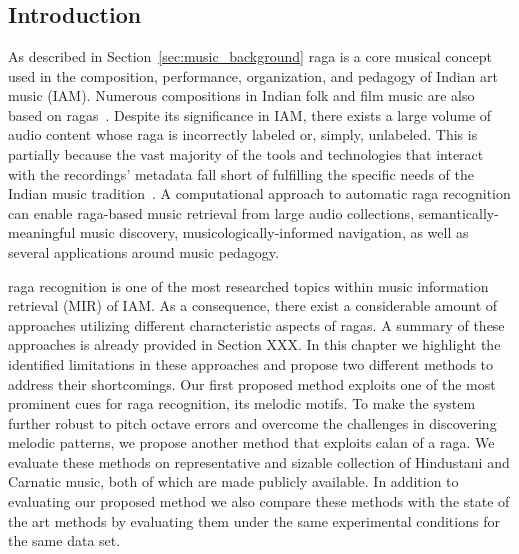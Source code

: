 
\chapter{}

\section{Introduction}


As described in Section~\ref{sec:music_background} \gls{raga} is a core musical concept used in the composition, performance, organization, and pedagogy of Indian art music (IAM). Numerous compositions in Indian folk and film music are also based on \glspl{raga}~\citep{ganti2013bollywood}. Despite its significance in IAM, there exists a large volume of audio content whose \gls{raga} is incorrectly labeled or, simply, unlabeled. This is partially because the vast majority of the tools and technologies that interact with the recordings' metadata fall short of fulfilling the specific needs of the Indian music tradition~\citep{XavierSerra2011}. A computational approach to automatic \gls{raga} recognition can enable \gls{raga}-based music retrieval from large audio collections, semantically-meaningful music discovery, musicologically-informed navigation, as well as several applications around music pedagogy. 

\Gls{raga} recognition is one of the most researched topics within music information retrieval (MIR) of IAM. As a consequence, there exist a considerable amount of approaches utilizing different characteristic aspects of \glspl{raga}. A summary of these approaches is already provided in Section XXX. In this chapter we highlight the identified limitations in these approaches and propose two different methods to address their shortcomings. Our first proposed method exploits one of the most prominent cues for \gls{raga} recognition, its melodic motifs. To make the system further robust to pitch octave errors and overcome the challenges in discovering melodic patterns, we propose another method that exploits calan of a \gls{raga}. We evaluate these methods on representative and sizable collection of Hindustani and Carnatic music, both of which are made publicly available. In addition to evaluating our proposed method we also compare these methods with the state of the art methods by evaluating them under the same experimental conditions for the same data set. 

